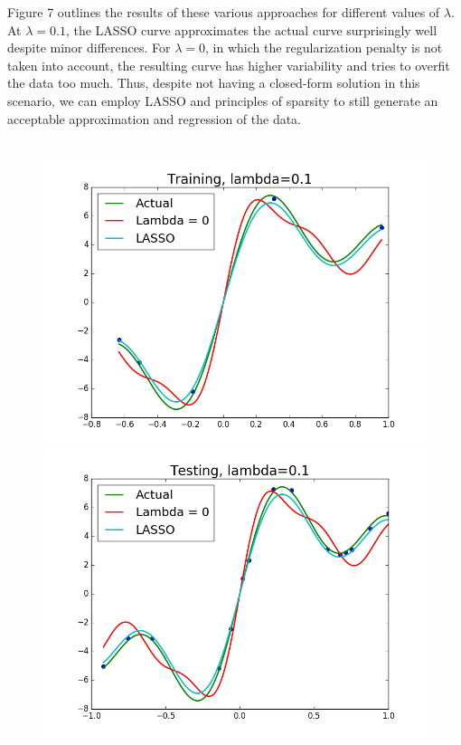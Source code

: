 \documentclass{article}
\begin{document}
Figure 7 outlines the results of these various approaches for different values of $\lambda$. At $\lambda = 0.1$, the LASSO curve approximates the actual curve surprisingly well despite minor differences. For $\lambda = 0$, in which the regularization penalty is not taken into account, the resulting curve has higher variability and tries to overfit the data too much. Thus, despite not having a closed-form solution in this scenario, we can employ LASSO and principles of sparsity to still generate an acceptable approximation and regression of the data. \\ \\

\begin{figure}[width=\linewidth]
\centering
\begin{multicols}{2}
  \includegraphics[width=1.2\linewidth]{code/P4/training,01.png}
  \includegraphics[width=1.2\linewidth]{code/P4/testing,01.png}

\end{multicols}
\end{figure}
\end{document}
